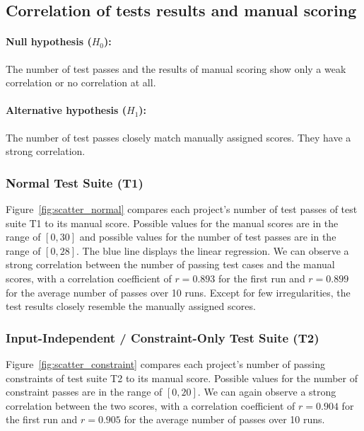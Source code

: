 \subsection{Correlation of tests results and manual scoring}

\paragraph{Null hypothesis ($H_0$):}
The number of test passes and the results of manual scoring show only a weak correlation or no correlation at all.
\vspace{-\medskipamount}
\paragraph{Alternative hypothesis ($H_1$):}
The number of test passes closely match manually assigned scores.
They have a strong correlation.

\subsubsection{Normal Test Suite (T1)}

Figure~\ref{fig:scatter_normal} compares each project's number of test passes of test suite T1 to its manual score.
Possible values for the manual scores are in the range of $[0, 30]$ and possible values for the number of test passes are in the range of $[0, 28]$.
The blue line displays the linear regression.
We can observe a strong correlation between the number of passing test cases and the manual scores,
with a correlation coefficient of $r = 0.893$ for the first run and $r = 0.899$ for the average number of passes over 10 runs.
Except for few irregularities, the test results closely resemble the manually assigned scores.

\subsubsection{Input-Independent / Constraint-Only Test Suite (T2)}

Figure~\ref{fig:scatter_constraint} compares each project's number of passing constraints of test suite T2 to its manual score.
Possible values for the number of constraint passes are in the range of $[0, 20]$.
We can again observe a strong correlation between the two scores,
with a correlation coefficient of $r = 0.904$ for the first run and $r = 0.905$ for the average number of passes over 10 runs.

